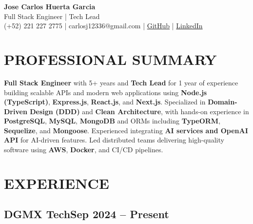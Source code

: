\documentclass[a4paper,10pt]{article}
\newcommand{\kw}[1]{\textbf{\textcolor{keyword}{#1}}}
\begin{document}
\begin{center}
{\bfseries\LARGE Jose Carlos Huerta Garcia} \\
Full Stack Engineer | Tech Lead \\
(+52) 221 227 2775 | carlosj12336@gmail.com | \href{https://github.com/jcarloshg}{GitHub} | \href{https://www.linkedin.com/in/jose-carlos-huerta-garcia-773952212}{LinkedIn}
\end{center}

\section*{PROFESSIONAL SUMMARY}
\kw{Full Stack Engineer} with 5+ years and \kw{Tech Lead} for 1 year of experience building scalable APIs and modern web applications using \kw{Node.js (TypeScript)}, \kw{Express.js}, \kw{React.js}, and \kw{Next.js}. Specialized in \kw{Domain-Driven Design (DDD)} and \kw{Clean Architecture}, with hands-on experience in \kw{PostgreSQL}, \kw{MySQL}, \kw{MongoDB} and ORMs including \kw{TypeORM}, \kw{Sequelize}, and \kw{Mongoose}. Experienced integrating \kw{AI services and OpenAI API} for AI-driven features. Led distributed teams delivering high-quality software using \kw{AWS}, \kw{Docker}, and CI/CD pipelines.

\section*{EXPERIENCE}

\subsection*{DGMX Tech\hfill\textbf{Sep 2024 -- Present}}
\end{document}
